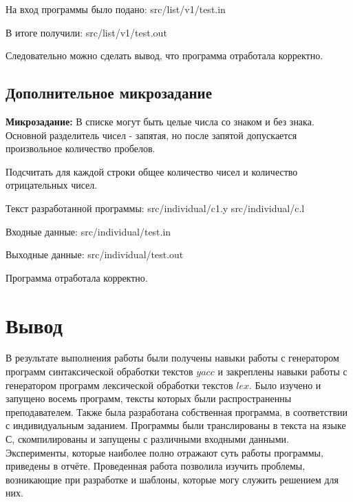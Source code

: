    На вход программы было подано:
     {src/list/v1/test.in}

    В итоге получили:
     {src/list/v1/test.out}

    Следовательно можно сделать вывод, что программа отработала корректно.


\subsection{Дополнительное микрозадание}

    \textbf{Микрозадание:}
    В списке могут быть целые числа со знаком и без знака.
    Основной разделитель чисел - запятая,
    но после запятой допускается произвольное количество пробелов.

    Подсчитать для каждой строки общее количество чисел
    и количество отрицательных чисел.

    Текст разработанной программы:
     {src/individual/c1.y}
     {src/individual/c.l}

    Входные данные:
     {src/individual/test.in}

    Выходные данные:
     {src/individual/test.out}

    Программа отработала корректно.


\section{Вывод}

    В результате выполнения работы были получены навыки работы с
    генератором программ синтаксической обработки текстов $yacc$
    и закреплены навыки работы с генератором программ лексической обработки текстов $lex$.
    Было изучено и запущено восемь программ,
    тексты которых были распространенны преподавателем.
    Также была разработана собственная программа,
    в соответствии с индивидуальным заданием.
    Программы были транслированы в текста на языке С,
    скомпилированы и запущены с различными входными данными.
    Эксперименты, которые наиболее полно
    отражают суть работы программы, приведены в отчёте.
    Проведенная работа позволила изучить проблемы, возникающие при разработке и шаблоны,
    которые могу служить решением для них.


